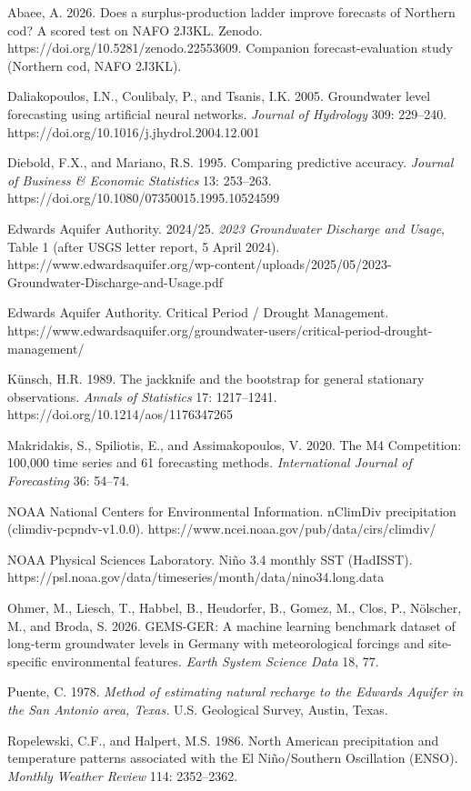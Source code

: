\documentclass[11pt]{article}
\begin{document}
Abaee, A. 2026. Does a surplus-production ladder improve forecasts of
Northern cod? A scored test on NAFO 2J3KL. Zenodo.
https://doi.org/10.5281/zenodo.22553609. Companion forecast-evaluation
study (Northern cod, NAFO 2J3KL).

Daliakopoulos, I.N., Coulibaly, P., and Tsanis, I.K. 2005. Groundwater
level forecasting using artificial neural networks. \emph{Journal of
Hydrology} 309: 229--240. https://doi.org/10.1016/j.jhydrol.2004.12.001

Diebold, F.X., and Mariano, R.S. 1995. Comparing predictive accuracy.
\emph{Journal of Business \& Economic Statistics} 13: 253--263.
https://doi.org/10.1080/07350015.1995.10524599

Edwards Aquifer Authority. 2024/25. \emph{2023 Groundwater Discharge and
Usage}, Table 1 (after USGS letter report, 5 April 2024).
https://www.edwardsaquifer.org/wp-content/uploads/2025/05/2023-Groundwater-Discharge-and-Usage.pdf

Edwards Aquifer Authority. Critical Period / Drought Management.
https://www.edwardsaquifer.org/groundwater-users/critical-period-drought-management/

K\"unsch, H.R. 1989. The jackknife and the bootstrap for general
stationary observations. \emph{Annals of Statistics} 17: 1217--1241.
https://doi.org/10.1214/aos/1176347265

Makridakis, S., Spiliotis, E., and Assimakopoulos, V. 2020. The M4
Competition: 100,000 time series and 61 forecasting methods.
\emph{International Journal of Forecasting} 36: 54--74.

NOAA National Centers for Environmental Information. nClimDiv
precipitation (climdiv-pcpndv-v1.0.0).
https://www.ncei.noaa.gov/pub/data/cirs/climdiv/

NOAA Physical Sciences Laboratory. Ni\~no 3.4 monthly SST (HadISST).
https://psl.noaa.gov/data/timeseries/month/data/nino34.long.data

Ohmer, M., Liesch, T., Habbel, B., Heudorfer, B., Gomez, M., Clos, P.,
N\"olscher, M., and Broda, S. 2026. GEMS-GER: A machine learning benchmark
dataset of long-term groundwater levels in Germany with meteorological
forcings and site-specific environmental features. \emph{Earth System
Science Data} 18, 77.

Puente, C. 1978. \emph{Method of estimating natural recharge to the
Edwards Aquifer in the San Antonio area, Texas.} U.S. Geological Survey,
Austin, Texas.

Ropelewski, C.F., and Halpert, M.S. 1986. North American precipitation
and temperature patterns associated with the El Ni\~no/Southern
Oscillation (ENSO). \emph{Monthly Weather Review} 114: 2352--2362.
\end{document}
